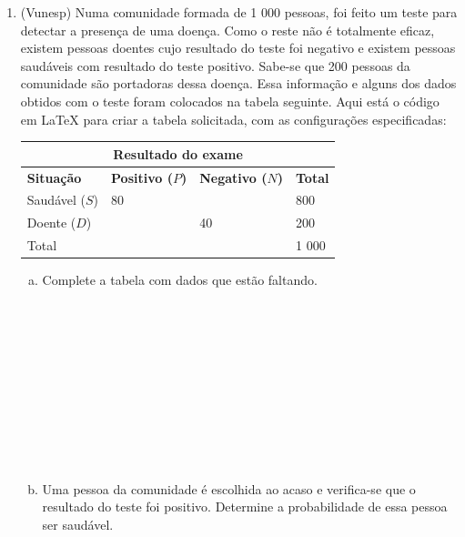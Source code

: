 \documentclass[a4paper,14pt]{article}
\begin{document}
\begin{multicols}{2}
\begin{enumerate}
		    \item (Vunesp) Numa comunidade formada de 1 000 pessoas, foi feito um teste para detectar a presença de uma doença. Como o reste não é totalmente eficaz, existem pessoas doentes cujo resultado do teste foi negativo e existem pessoas saudáveis com resultado do teste positivo. Sabe-se que 200 pessoas da comunidade são portadoras dessa doença. Essa informação e alguns dos dados obtidos com o teste foram colocados na tabela seguinte.
		    Aqui está o código em LaTeX para criar a tabela solicitada, com as configurações especificadas:
	    	\begin{table}[H]
	    		\renewcommand{\arraystretch}{1.2} %
	    		\begin{tabular}{|m{2cm}|m{1.8cm}|m{2cm}|m{1.2cm}|}
	    			\hline
	    			\multicolumn{4}{|c|}{\textbf{Resultado do exame}} \\ \hline
	    			\textbf{Situação} & \textbf{Positivo ($P$)} & \textbf{Negativo ($N$)} & \textbf{Total} \\ \hline
	    			Saudável ($S$) & 80 & ~ & 800 \\ \hline
	    			Doente ($D$) & ~ & 40 & 200 \\ \hline
	    			Total & ~ & ~ & 1 000 \\ \hline
	    		\end{tabular}
	    	\end{table}
	    	\begin{enumerate}[a)]
	    		\item Complete a tabela com dados que estão faltando. \\\\\\\\\\\\\\\\\\\\\\
	    		\item Uma pessoa da comunidade é escolhida ao acaso e verifica-se que o resultado do teste foi positivo. Determine a probabilidade de essa pessoa ser saudável. \\\\\\\\\\\\\\\\\\\\

\end{enumerate}
\end{enumerate}
\end{multicols}
\end{document}
